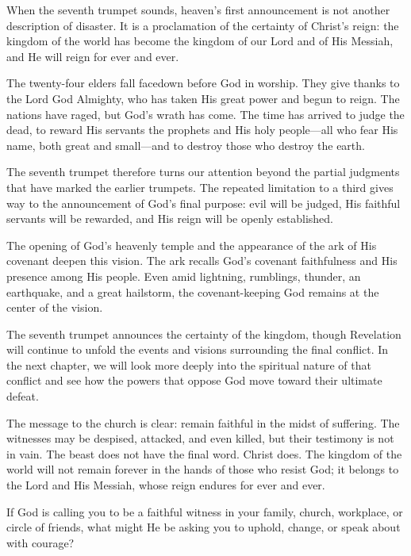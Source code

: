 When the seventh trumpet sounds, heaven's first announcement is not another description of disaster. It is a proclamation of the certainty of Christ's reign: the kingdom of the world has become the kingdom of our Lord and of His Messiah, and He will reign for ever and ever.

The twenty-four elders fall facedown before God in worship. They give thanks to the Lord God Almighty, who has taken His great power and begun to reign. The nations have raged, but God's wrath has come. The time has arrived to judge the dead, to reward His servants the prophets and His holy people—all who fear His name, both great and small—and to destroy those who destroy the earth.

The seventh trumpet therefore turns our attention beyond the partial judgments that have marked the earlier trumpets. The repeated limitation to a third gives way to the announcement of God's final purpose: evil will be judged, His faithful servants will be rewarded, and His reign will be openly established.

The opening of God's heavenly temple and the appearance of the ark of His covenant deepen this vision. The ark recalls God's covenant faithfulness and His presence among His people. Even amid lightning, rumblings, thunder, an earthquake, and a great hailstorm, the covenant-keeping God remains at the center of the vision.

The seventh trumpet announces the certainty of the kingdom, though Revelation will continue to unfold the events and visions surrounding the final conflict. In the next chapter, we will look more deeply into the spiritual nature of that conflict and see how the powers that oppose God move toward their ultimate defeat.

The message to the church is clear: remain faithful in the midst of suffering. The witnesses may be despised, attacked, and even killed, but their testimony is not in vain. The beast does not have the final word. Christ does. The kingdom of the world will not remain forever in the hands of those who resist God; it belongs to the Lord and His Messiah, whose reign endures for ever and ever.

\begin{ReaderQuestion}
If God is calling you to be a faithful witness in your family, church, workplace, or circle of friends, what might He be asking you to uphold, change, or speak about with courage?
\end{ReaderQuestion}

